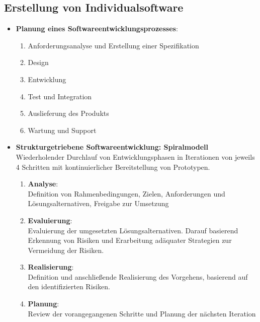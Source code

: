 \documentclass[12pt,a4paper]{article}
\begin{document}
\subsection{Erstellung von Individualsoftware} %
\begin{itemize}
   \item \textbf{Planung eines Softwareentwicklungsprozesses}:
      \begin{enumerate}
			\item Anforderungsanalyse und Erstellung einer Spezifikation
			\item Design
			\item Entwicklung
			\item Test und Integration
			\item Auslieferung des Produkts
			\item Wartung und Support
      \end{enumerate}
   
   \item \textbf{Strukturgetriebene Softwareentwicklung: Spiralmodell}\\
         Wiederholender Durchlauf von Entwicklungsphasen in Iterationen von jeweils 4 Schritten mit kontinuierlicher Bereitstellung von Prototypen.
      \begin{enumerate}
         \item \textbf{Analyse}:\\
                Definition von Rahmenbedingungen, Zielen, Anforderungen und Lö\-sungs\-alt\-er\-na\-ti\-ven, Freigabe zur Umsetzung
         \item \textbf{Evaluierung}:\\
                Evaluierung der umgesetzten Lösungsalternativen. Darauf basierend Erkennung von Risiken und Erarbeitung adäquater Strategien zur Vermeidung der Risiken.
         \item \textbf{Realisierung}:\\
                Definition und anschließende Realisierung des Vorgehens, basierend auf den identifizierten Risiken.
         \item \textbf{Planung}:\\
                Review der vorangegangenen Schritte und Planung der nächsten Iteration
      \end{enumerate}
   

\end{itemize}
\end{document}
